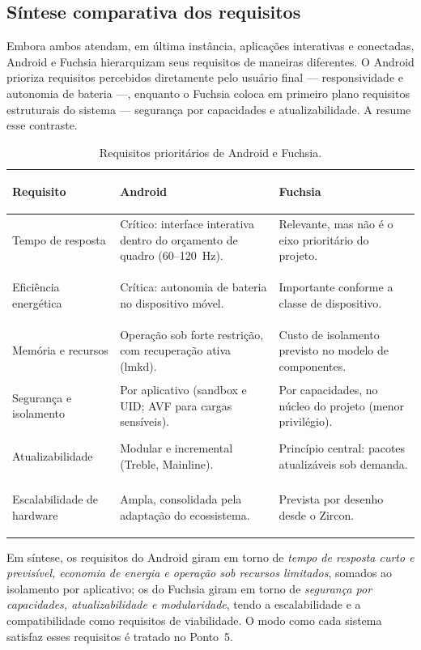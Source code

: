 \documentclass[12pt,a4paper]{article}
\begin{document}
\subsection{Síntese comparativa dos requisitos}

Embora ambos atendam, em última instância, aplicações interativas e conectadas,
Android e Fuchsia hierarquizam seus requisitos de maneiras diferentes. O Android
prioriza requisitos percebidos diretamente pelo usuário final --- responsividade e
autonomia de bateria ---, enquanto o Fuchsia coloca em primeiro plano requisitos
estruturais do sistema --- segurança por capacidades e atualizabilidade. A
 resume esse contraste.

\begin{table}[htbp]
  \centering
  \caption{Requisitos prioritários de Android e Fuchsia.}
  \label{tab:requisitos}
  \begin{tabular}{>{\bfseries\raggedright\arraybackslash}p{3.4cm} p{4.6cm} p{4.6cm}}
    \toprule
    Requisito & Android & Fuchsia \\
    \midrule
    Tempo de resposta & Crítico: interface interativa dentro do orçamento de quadro (60--120~Hz). & Relevante, mas não é o eixo prioritário do projeto. \\
    Eficiência energética & Crítica: autonomia de bateria no dispositivo móvel. & Importante conforme a classe de dispositivo. \\
    Memória e recursos & Operação sob forte restrição, com recuperação ativa (lmkd). & Custo de isolamento previsto no modelo de componentes. \\
    Segurança e isolamento & Por aplicativo (sandbox e UID; AVF para cargas sensíveis). & Por capacidades, no núcleo do projeto (menor privilégio). \\
    Atualizabilidade & Modular e incremental (Treble, Mainline). & Princípio central: pacotes atualizáveis sob demanda. \\
    Escalabilidade de hardware & Ampla, consolidada pela adaptação do ecossistema. & Prevista por desenho desde o Zircon. \\
    \bottomrule
  \end{tabular}
\end{table}

Em síntese, os requisitos do Android giram em torno de \emph{tempo de resposta
curto e previsível, economia de energia e operação sob recursos limitados},
somados ao isolamento por aplicativo; os do Fuchsia giram em torno de
\emph{segurança por capacidades, atualizabilidade e modularidade}, tendo a
escalabilidade e a compatibilidade como requisitos de viabilidade. O modo como
cada sistema satisfaz esses requisitos é tratado no Ponto~5.
\end{document}
